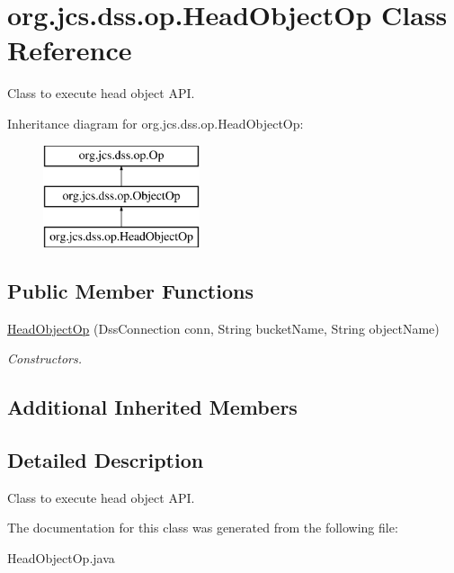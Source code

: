 \hypertarget{classorg_1_1jcs_1_1dss_1_1op_1_1HeadObjectOp}{}\section{org.\+jcs.\+dss.\+op.\+Head\+Object\+Op Class Reference}
\label{classorg_1_1jcs_1_1dss_1_1op_1_1HeadObjectOp}


Class to execute head object A\+PI.  


Inheritance diagram for org.\+jcs.\+dss.\+op.\+Head\+Object\+Op\+:\begin{figure}[H]
\begin{center}
\leavevmode
\includegraphics[height=3.000000cm]{classorg_1_1jcs_1_1dss_1_1op_1_1HeadObjectOp}
\end{center}
\end{figure}
\subsection*{Public Member Functions}
\begin{DoxyCompactItemize}
\item 
\hyperlink{classorg_1_1jcs_1_1dss_1_1op_1_1HeadObjectOp_a6fe2525bad4cb66ba7a8db109ea5d220}{Head\+Object\+Op} (Dss\+Connection conn, String bucket\+Name, String object\+Name)\hypertarget{classorg_1_1jcs_1_1dss_1_1op_1_1HeadObjectOp_a6fe2525bad4cb66ba7a8db109ea5d220}{}\label{classorg_1_1jcs_1_1dss_1_1op_1_1HeadObjectOp_a6fe2525bad4cb66ba7a8db109ea5d220}

\begin{DoxyCompactList}\small\item\em Constructors. \end{DoxyCompactList}\end{DoxyCompactItemize}
\subsection*{Additional Inherited Members}


\subsection{Detailed Description}
Class to execute head object A\+PI. 

The documentation for this class was generated from the following file\+:\begin{DoxyCompactItemize}
\item 
Head\+Object\+Op.\+java\end{DoxyCompactItemize}
